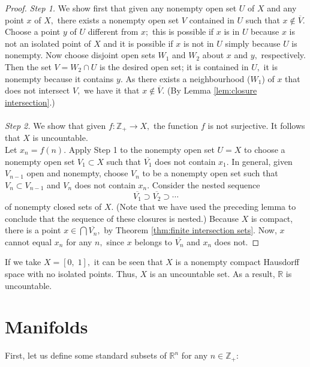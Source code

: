 \documentclass{article}
\theoremstyle{definition}
\begin{document}
\begin{proof}
  \emph{Step 1.} We show first that given any nonempty open set $U$ of $X$ and any point $x$ of $X,$ there exists a nonempty open set $V$ contained in $U$ such that $x \not\in \overline{V}.$\\
  Choose a point $y$ of $U$ different from $x;$ this is possible if $x$ is in $U$ because $x$ is not an isolated point of $X$ and it is possible if $x$ is not in $U$ simply because $U$ is nonempty. Now choose disjoint open sets $W_1$ and $W_2$ about $x$ and $y,$ respectively. Then the set $V = W_2 \cap U$ is the desired open set; it is contained in $U,$ it is nonempty because it contains $y.$ As there exists a neighbourhood ($W_1$) of $x$ that does not intersect $V,$ we have it that $x \not\in \overline{V}.$ (By Lemma \ref{lem:closure intersection}.)\\~\\
  \emph{Step 2.} We show that given $f:\mathbb{Z}_+ \longrightarrow X,$ the function $f$ is not surjective. It follows that $X$ is uncountable.\\
  Let $x_n = f(n).$ Apply Step 1 to the nonempty open set $U = X$ to choose a nonempty open set $V_1 \subset X$ such that $\overline{V_1}$ does not contain $x_1.$ In general, given $V_{n-1}$ open and nonempty, choose $V_n$ to be a nonempty open set such that $V_n \subset V_{n-1}$ and $V_n$ does not contain $x_n.$ Consider the nested sequence
  \[\overline{V_1} \supset \overline{V_2} \supset \cdots\]
  of nonempty closed sets of $X.$ (Note that we have used the preceding lemma to conclude that the sequence of these closures is nested.) Because $X$ is compact, there is a point $x \in \bigcap \overline{V_n},$ by Theorem \ref{thm:finite intersection sets}. Now, $x$ cannot equal $x_n$ for any $n,$ since $x$ belongs to $\overline{V_n}$ and $x_n$ does not.
\end{proof}
If we take $X = [0,\;1],$ it can be seen that $X$ is a nonempty compact Hausdorff space with no isolated points. Thus, $X$ is an uncountable set. As a result, $\mathbb{R}$ is uncountable.
\newpage
\section{Manifolds}
First, let us define some standard subsets of $\mathbb{R}^n$ for any $n \in \mathbb{Z}_+:$
\end{document}
